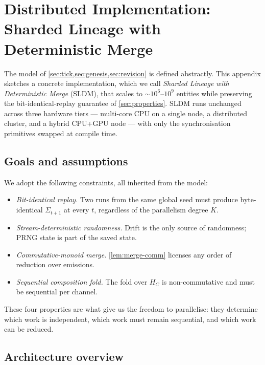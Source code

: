 \documentclass[journal,onecolumn,11pt]{IEEEtran}
\theoremstyle{definition}
\begin{document}
\appendices

\section{Distributed Implementation: Sharded Lineage with Deterministic Merge}
\label{appx:sldm}

The model of \cref{sec:tick,sec:genesis,sec:revision} is defined abstractly. This appendix sketches a concrete implementation, which we call \emph{Sharded Lineage with Deterministic Merge} (SLDM), that scales to $\sim\!10^6$--$10^9$ entities while preserving the bit-identical-replay guarantee of \cref{sec:properties}. SLDM runs unchanged across three hardware tiers --- multi-core CPU on a single node, a distributed cluster, and a hybrid CPU+GPU node --- with only the synchronisation primitives swapped at compile time.

\subsection{Goals and assumptions}

We adopt the following constraints, all inherited from the model:

\begin{itemize}[leftmargin=1.5em,nosep]
\item \emph{Bit-identical replay.} Two runs from the same global seed must produce byte-identical $\Sigma_{t+1}$ at every $t$, regardless of the parallelism degree $K$.
\item \emph{Stream-deterministic randomness.} Drift is the only source of randomness; PRNG state is part of the saved state.
\item \emph{Commutative-monoid merge.} \cref{lem:merge-comm} licenses any order of reduction over emissions.
\item \emph{Sequential composition fold.} The fold over $H_C$ is non-commutative and must be sequential per channel.
\end{itemize}

These four properties are what give us the freedom to parallelise: they determine which work is independent, which work must remain sequential, and which work can be reduced.

\subsection{Architecture overview}
\end{document}
